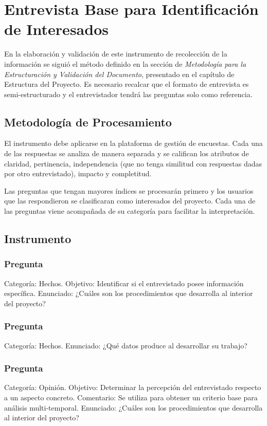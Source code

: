 \chapter{Entrevista Base para Identificación de Interesados}
\label{appendix:entrevista_posible_interesado}

En la elaboración y validación de este instrumento de recolección de la información se siguió el método definido en la sección de \textit{Metodología para la Estructuración y Validación del Documento}, presentado en el capítulo de Estructura del Proyecto. Es necesario recalcar que el formato de entrevista es semi-estructurado y el entrevistador tendrá las preguntas solo como referencia.

\section{Metodología de Procesamiento}
El instrumento debe aplicarse en la plataforma de gestión de encuestas. Cada una de las respuestas se analiza de manera separada y se califican los atributos de claridad, pertinencia, independencia (que no tenga similitud con respuestas dadas por otro entrevistado), impacto y completitud.

Las preguntas que tengan mayores índices se procesarán primero y los usuarios que las respondieron se clasificaran como interesados del proyecto. Cada una de las preguntas viene acompañada de su categoría para facilitar la interpretación.

\section{Instrumento}

\subsection{Pregunta}
Categoría: Hechos.
Objetivo: Identificar si el entrevistado posee información específica.
Enunciado: ¿Cuáles son los procedimientos que desarrolla al interior del proyecto?

\subsection{Pregunta}
Categoría: Hechos.
Enunciado: ¿Qué datos produce al desarrollar su trabajo?

\subsection{Pregunta}
Categoría: Opinión.
Objetivo: Determinar la percepción del entrevistado respecto a un aspecto concreto.
Comentario: Se utiliza para obtener un criterio base para análisis multi-temporal.
Enunciado: ¿Cuáles son los procedimientos que desarrolla al interior del proyecto?

